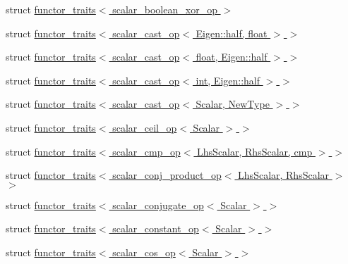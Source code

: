 \begin{DoxyCompactItemize}
\item 
struct \hyperlink{struct_eigen_1_1internal_1_1functor__traits_3_01scalar__boolean__xor__op_01_4}{functor\+\_\+traits$<$ scalar\+\_\+boolean\+\_\+xor\+\_\+op $>$}
\item 
struct \hyperlink{struct_eigen_1_1internal_1_1functor__traits_3_01scalar__cast__op_3_01_eigen_1_1half_00_01float_01_4_01_4}{functor\+\_\+traits$<$ scalar\+\_\+cast\+\_\+op$<$ Eigen\+::half, float $>$ $>$}
\item 
struct \hyperlink{struct_eigen_1_1internal_1_1functor__traits_3_01scalar__cast__op_3_01float_00_01_eigen_1_1half_01_4_01_4}{functor\+\_\+traits$<$ scalar\+\_\+cast\+\_\+op$<$ float, Eigen\+::half $>$ $>$}
\item 
struct \hyperlink{struct_eigen_1_1internal_1_1functor__traits_3_01scalar__cast__op_3_01int_00_01_eigen_1_1half_01_4_01_4}{functor\+\_\+traits$<$ scalar\+\_\+cast\+\_\+op$<$ int, Eigen\+::half $>$ $>$}
\item 
struct \hyperlink{struct_eigen_1_1internal_1_1functor__traits_3_01scalar__cast__op_3_01_scalar_00_01_new_type_01_4_01_4}{functor\+\_\+traits$<$ scalar\+\_\+cast\+\_\+op$<$ Scalar, New\+Type $>$ $>$}
\item 
struct \hyperlink{struct_eigen_1_1internal_1_1functor__traits_3_01scalar__ceil__op_3_01_scalar_01_4_01_4}{functor\+\_\+traits$<$ scalar\+\_\+ceil\+\_\+op$<$ Scalar $>$ $>$}
\item 
struct \hyperlink{struct_eigen_1_1internal_1_1functor__traits_3_01scalar__cmp__op_3_01_lhs_scalar_00_01_rhs_scalar_00_01cmp_01_4_01_4}{functor\+\_\+traits$<$ scalar\+\_\+cmp\+\_\+op$<$ Lhs\+Scalar, Rhs\+Scalar, cmp $>$ $>$}
\item 
struct \hyperlink{struct_eigen_1_1internal_1_1functor__traits_3_01scalar__conj__product__op_3_01_lhs_scalar_00_01_rhs_scalar_01_4_01_4}{functor\+\_\+traits$<$ scalar\+\_\+conj\+\_\+product\+\_\+op$<$ Lhs\+Scalar, Rhs\+Scalar $>$ $>$}
\item 
struct \hyperlink{struct_eigen_1_1internal_1_1functor__traits_3_01scalar__conjugate__op_3_01_scalar_01_4_01_4}{functor\+\_\+traits$<$ scalar\+\_\+conjugate\+\_\+op$<$ Scalar $>$ $>$}
\item 
struct \hyperlink{struct_eigen_1_1internal_1_1functor__traits_3_01scalar__constant__op_3_01_scalar_01_4_01_4}{functor\+\_\+traits$<$ scalar\+\_\+constant\+\_\+op$<$ Scalar $>$ $>$}
\item 
struct \hyperlink{struct_eigen_1_1internal_1_1functor__traits_3_01scalar__cos__op_3_01_scalar_01_4_01_4}{functor\+\_\+traits$<$ scalar\+\_\+cos\+\_\+op$<$ Scalar $>$ $>$}

\end{DoxyCompactItemize}
